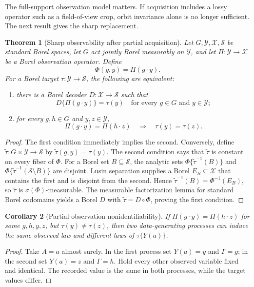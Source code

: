 \documentclass[11pt]{article}
\theoremstyle{plain}
\newtheorem{theorem}{Theorem}[section]
\newtheorem{corollary}[theorem]{Corollary}
\theoremstyle{definition}
\numberwithin{equation}{section}
\newcommand{\1}{\mathbf 1}
\newcommand{\calS}{\mathcal S}
\newcommand{\calX}{\mathcal X}
\newcommand{\calY}{\mathcal Y}
\begin{document}
The full-support observation model matters. If acquisition includes a lossy
operator such as a field-of-view crop, orbit invariance alone is no longer
sufficient. The next result gives the sharp replacement.

\begin{theorem}[Sharp observability after partial acquisition]
\label{thm:partial-observation}
Let $G,\calY,\calX,\calS$ be standard Borel spaces, let $G$ act jointly
Borel measurably on $\calY$, and let $\Pi:\calY\to\calX$ be a Borel
observation operator. Define
\[
\Phi(g,y)=\Pi(g\cdot y).
\]
For a Borel target $\tau:\calY\to\calS$, the following are equivalent:
\begin{enumerate}
\item there is a Borel decoder $D:\calX\to\calS$ such that
\[
D\{\Pi(g\cdot y)\}=\tau(y)
\quad\text{for every }g\in G\text{ and }y\in\calY;
\]
\item for every $g,h\in G$ and $y,z\in\calY$,
\[
\Pi(g\cdot y)=\Pi(h\cdot z)
\quad\Longrightarrow\quad
\tau(y)=\tau(z).
\]
\end{enumerate}
\end{theorem}

\begin{proof}
The first condition immediately implies the second. Conversely, define
$\widetilde\tau:G\times\calY\to\calS$ by
$\widetilde\tau(g,y)=\tau(y)$. The second condition says that
$\widetilde\tau$ is constant on every fiber of $\Phi$. For a Borel set
$B\subseteq\calS$, the analytic sets
$\Phi\{\widetilde\tau^{-1}(B)\}$ and
$\Phi\{\widetilde\tau^{-1}(\calS\setminus B)\}$ are disjoint. Lusin
separation supplies a Borel $E_B\subseteq\calX$ that contains the first and
is disjoint from the second. Hence
$\widetilde\tau^{-1}(B)=\Phi^{-1}(E_B)$, so $\widetilde\tau$ is
$\sigma(\Phi)$-measurable. The measurable factorization lemma for standard
Borel codomains yields a Borel $D$ with
$\widetilde\tau=D\circ\Phi$, proving the first condition.
\end{proof}

\begin{corollary}[Partial-observation nonidentifiability]
\label{cor:partial-nonid}
If $\Pi(g\cdot y)=\Pi(h\cdot z)$ for some $g,h,y,z$, but
$\tau(y)\ne\tau(z)$, then two data-generating processes can induce the same
observed law and different laws of $\tau\{Y(a)\}$.
\end{corollary}

\begin{proof}
Take $A=a$ almost surely. In the first process set $Y(a)=y$ and $\Gamma=g$;
in the second set $Y(a)=z$ and $\Gamma=h$. Hold every other observed variable
fixed and identical. The recorded value is the same in both processes, while
the target values differ.
\end{proof}
\end{document}

